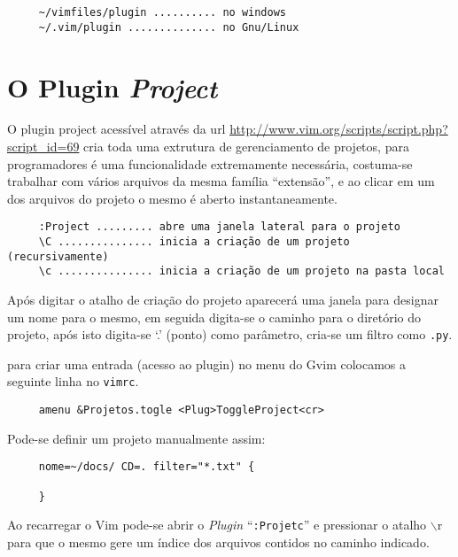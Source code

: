 \begin{verbatim}
     ~/vimfiles/plugin .......... no windows
     ~/.vim/plugin .............. no Gnu/Linux
\end{verbatim}


\section{O Plugin {\em Project}}

O plugin project acessível através da url \url{http://www.vim.org/scripts/script.php?script_id=69}
cria toda uma extrutura de gerenciamento de projetos, para programadores é uma funcionalidade
extremamente necessária, costuma-se trabalhar com vários arquivos da mesma família ``extensão'', 
e ao clicar em um dos arquivos do projeto o mesmo é aberto instantaneamente.

\begin{verbatim}
     :Project ......... abre uma janela lateral para o projeto
     \C ............... inicia a criação de um projeto (recursivamente)
     \c ............... inicia a criação de um projeto na pasta local
\end{verbatim}

Após digitar o atalho de criação do projeto aparecerá uma janela para designar um nome
para o mesmo, em seguida digita-se o caminho para o diretório do projeto, após isto
digita-se `.' (ponto) como parâmetro, cria-se um filtro como {\tt *.py}.


para criar uma entrada (acesso ao plugin) no menu do Gvim colocamos
a seguinte linha no {\tt vimrc}.

\begin{verbatim}
     amenu &Projetos.togle <Plug>ToggleProject<cr>
\end{verbatim}

Pode-se definir um projeto manualmente assim:

\begin{verbatim}
     nome=~/docs/ CD=. filter="*.txt" {

     }
\end{verbatim}

Ao recarregar o Vim pode-se abrir o {\em Plugin} ``{\tt :Projetc}'' e 
pressionar o atalho $\backslash$r para que o mesmo gere um índice dos arquivos
contidos no caminho indicado.
   




